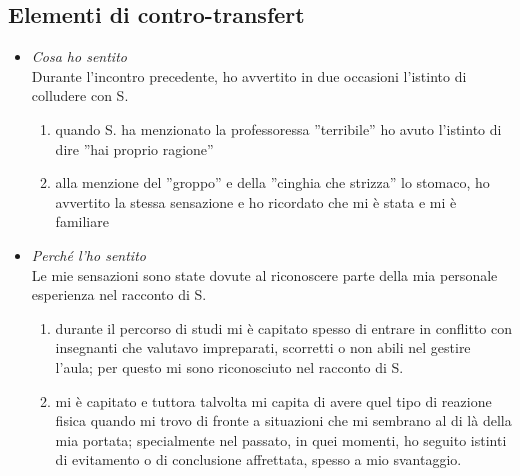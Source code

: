 \subsection*{Elementi di contro-transfert}
\begin{itemize}
\item \textsl{Cosa ho sentito}\\
Durante l'incontro precedente, ho avvertito in due occasioni l'istinto di colludere con S. 
\begin{enumerate}
\item quando S. ha menzionato la professoressa ''terribile'' ho avuto l'istinto di dire ''hai proprio ragione''
\item alla menzione del ''groppo'' e della ''cinghia che strizza'' lo stomaco, ho avvertito la stessa sensazione e ho ricordato che mi è stata e mi è familiare
\end{enumerate}

\item \textsl{Perché l'ho sentito}\\
Le mie sensazioni sono state dovute al riconoscere parte della mia personale esperienza nel racconto di S.
\begin{enumerate}
\item durante il percorso di studi mi è capitato spesso di entrare in conflitto con insegnanti che valutavo impreparati, scorretti o non abili nel gestire l'aula; per questo mi sono riconosciuto nel racconto di S. 
\item mi è capitato e tuttora talvolta mi capita di avere quel tipo di reazione fisica quando mi trovo di fronte a situazioni che mi sembrano al di là della mia portata; specialmente nel passato, in quei momenti, ho seguito istinti di evitamento o di conclusione affrettata, spesso a mio svantaggio.
\end{enumerate}


\end{itemize}
